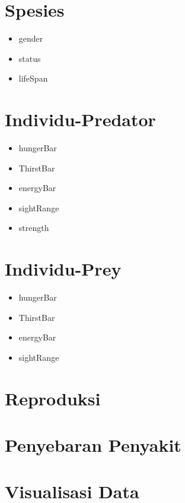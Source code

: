 \documentclass[12pt]{article}
\begin{document}
\section{Spesies}
\begin{itemize}
    \item gender
    \item status 
    \item lifeSpan
\end{itemize}
\section{Individu-Predator}
\begin{itemize}
    \item hungerBar
    \item ThirstBar
    \item energyBar
    \item sightRange
    \item strength
\end{itemize}
\section{Individu-Prey}
\begin{itemize}
    \item hungerBar
    \item ThirstBar
    \item energyBar
    \item sightRange
\end{itemize}
\section{Reproduksi}
\section{Penyebaran Penyakit}
\section{Visualisasi Data}


 
\end{document}
